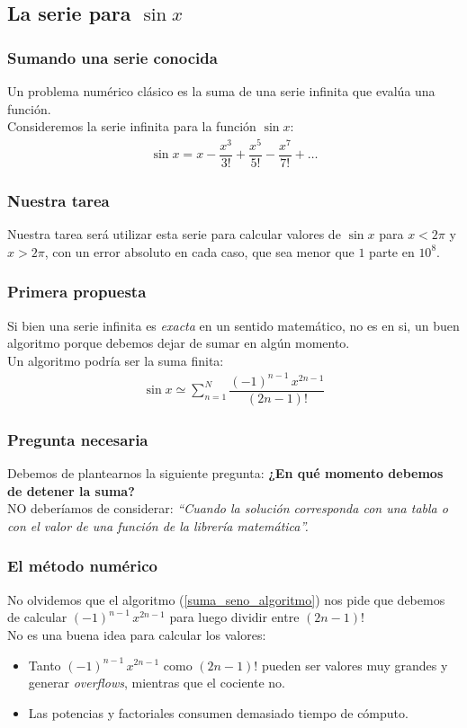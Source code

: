 \subsection{La serie para $\sin x$}
\begin{frame}
\frametitle{Sumando una serie conocida}
Un problema numérico clásico es la suma de una serie infinita que evalúa una función.
\\
\bigskip
\pause
Consideremos la serie infinita para la función $\sin x$:
\begin{align*}
\sin x =  x - \dfrac{x^{3}}{3!} + \dfrac{x^{5}}{5!} - \dfrac{x^{7}}{7!} + \ldots
\end{align*}
\end{frame}
\begin{frame}
\frametitle{Nuestra tarea}
Nuestra tarea será utilizar esta serie para calcular valores de $\sin x$ para $x < 2 \pi$ y $x > 2 \pi$, con un error absoluto en cada caso, que sea menor que $1$ parte en $10^{8}$.
\end{frame}
\begin{frame}
\frametitle{Primera propuesta}
Si bien una serie infinita es \emph{exacta} en un sentido matemático, no es en si, un buen algoritmo porque debemos dejar de sumar en algún momento.
\\
\bigskip
\pause
Un algoritmo podría ser la suma finita:
\begin{align}
\sin x \simeq \sum_{n = 1}^{N} \dfrac{(-1)^{n-1} \, x^{2 n - 1}}{(2 n - 1)!}
\label{suma_seno_algoritmo}
\end{align}
\end{frame}
\begin{frame}
\frametitle{Pregunta necesaria}
Debemos de plantearnos la siguiente pregunta: \textbf{¿En qué momento debemos de detener la suma?}
\\
\bigskip
NO deberíamos de considerar: \emph{\enquote{Cuando la solución corresponda con una tabla o con el valor de una función de la librería matemática}.} 
\end{frame}
\begin{frame}
\frametitle{El método numérico}
No olvidemos que el algoritmo (\ref{suma_seno_algoritmo}) nos pide que debemos de calcular $(-1)^{n-1} \, x^{2 n - 1}$ para luego dividir entre $(2 n - 1)!$
\\
\bigskip
\pause
No es una buena idea para calcular los valores:
\begin{itemize}[<+->]
\item Tanto $(-1)^{n-1} \, x^{2 n - 1}$ como $(2 n - 1)!$ pueden ser valores muy grandes y generar \emph{overflows}, mientras que el cociente no.
\item Las potencias y factoriales consumen demasiado tiempo de cómputo.
\end{itemize}
\end{frame}

